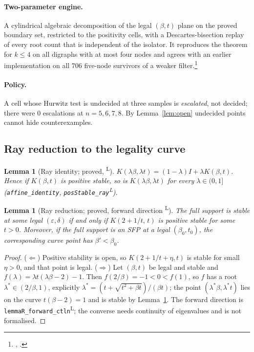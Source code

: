 \documentclass[11pt]{article}
\newtheorem{lemma}[theorem]{Lemma}
\theoremstyle{definition}
\newcommand{\eps}{\varepsilon}
\newcommand{\lean}{\textsuperscript{\textsf{L}}}
\begin{document}
\paragraph{Two-parameter engine.} A cylindrical algebraic decomposition of the legal $(\beta,t)$ plane on the proved
boundary set, restricted to the positivity cells, with a Descartes-bisection replay of every root count that is
independent of the isolator. It reproduces the theorem for $k\le4$ on all digraphs with at most four nodes and agrees
with an earlier implementation on all $706$ five-node survivors of a weaker filter.\footnote{, .}

\paragraph{Policy.} A cell whose Hurwitz test is undecided at three samples is \emph{escalated}, not decided; there were $0$
escalations at $n=5,6,7,8$. By Lemma~\ref{lem:open} undecided points cannot hide counterexamples.

\subsection{Ray reduction to the legality curve}
\begin{lemma}[Ray identity; proved, \lean]\label{lem:rayF}
$K(\lambda\beta,\lambda t)=(1-\lambda)I+\lambda K(\beta,t)$. Hence if $K(\beta,t)$ is positive stable, so is
$K(\lambda\beta,\lambda t)$ for every $\lambda\in(0,1]$ (\texttt{affine\_identity}, \texttt{posStable\_ray}\lean).
\end{lemma}

\begin{lemma}[Ray reduction; proved, forward direction \lean]\label{lem:rayR}
The full support is stable at some legal $(\eps,\delta)$ if and only if $K(2+1/t,\,t)$ is positive stable for some
$t>0$. Moreover, if the full support is an SFP at a legal $(\beta_0,t_0)$, the corresponding curve point has
$\beta'<\beta_0$.
\end{lemma}
\begin{proof}
($\Leftarrow$) Positive stability is open, so $K(2+1/t+\eta,t)$ is stable for small $\eta>0$, and that point is legal.
($\Rightarrow$) Let $(\beta,t)$ be legal and stable and $f(\lambda)=\lambda t(\lambda\beta-2)-1$. Then $f(2/\beta)=-1<0<f(1)$, so
$f$ has a root $\lambda^*\in(2/\beta,1)$, explicitly $\lambda^*=(t+\sqrt{t^2+\beta t})/(\beta t)$; the point
$(\lambda^*\beta,\lambda^*t)$ lies on the curve $t(\beta-2)=1$ and is stable by Lemma~\ref{lem:rayF}.
The forward direction is \texttt{lemmaR\_forward\_ctln}\lean; the converse needs continuity of eigenvalues and is not
formalised.
\end{proof}
\end{document}
